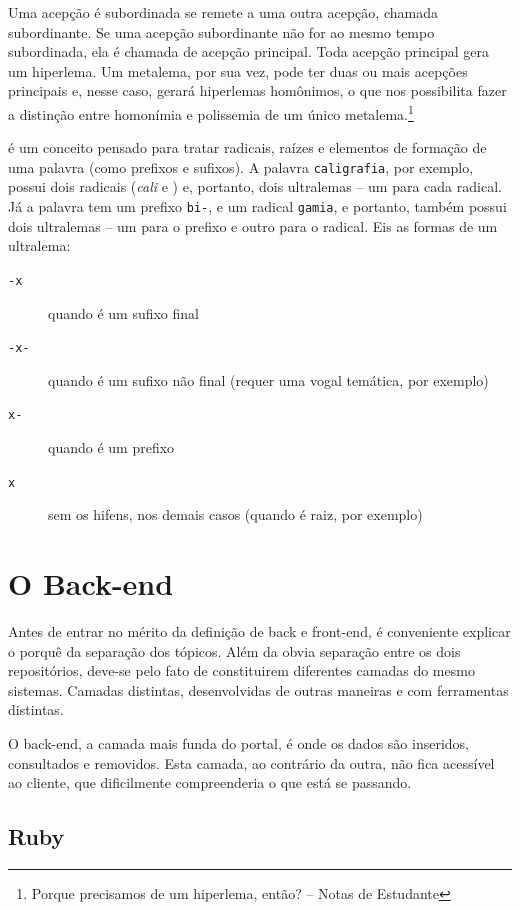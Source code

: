 Uma acepção é subordinada se remete a uma outra acepção, chamada subordinante. Se uma acepção
subordinante não for ao mesmo tempo subordinada, ela é chamada de acepção principal. Toda
acepção principal gera um hiperlema. Um metalema, por sua vez, pode ter duas ou mais acepções
principais e, nesse caso, gerará hiperlemas homônimos, o que nos possibilita fazer a distinção
entre homonímia e polissemia de um único metalema.\footnote{Porque precisamos de um hiperlema,
então? -- Notas de Estudante}

 é um conceito pensado para tratar radicais, raízes e elementos de formação de
uma palavra (como prefixos e sufixos). A palavra \texttt{caligrafia}, por exemplo, possui dois
radicais (\emph{cali} e ) e, portanto, dois ultralemas – um para cada radical. Já
a palavra  tem um prefixo \texttt{bi-}, e um radical \texttt{gamia}, e portanto,
também possui dois ultralemas – um para o prefixo e outro para o radical. Eis as formas de um
ultralema:
\begin{description}
    \item[\texttt{-x}] quando é um sufixo final
    \item[\texttt{-x-}] quando é um sufixo não final (requer uma vogal temática, por
    exemplo)
    \item[\texttt{x-}] quando é um prefixo
    \item[\texttt{x}] sem os hifens, nos demais casos (quando é raiz, por exemplo)
\end{description}

\section{O Back-end}
\label{sec:back-end}

Antes de entrar no mérito da definição de back e front-end, é conveniente explicar o porquê da
separação dos tópicos. Além da obvia separação entre os dois repositórios, deve-se pelo fato de
constituirem diferentes camadas do mesmo sistemas. Camadas distintas, desenvolvidas de outras
maneiras e com ferramentas distintas.

O back-end, a camada mais funda do portal, é onde os dados são inseridos, consultados e removidos.
Esta camada, ao contrário da outra, não fica acessível ao cliente, que dificilmente compreenderia
o que está se passando.

\subsection{Ruby}
\label{subsec:ruby}

